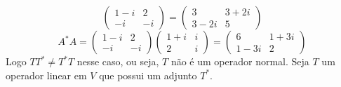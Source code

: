 \documentclass[11pt,a4paper]{article}
\begin{document}
{\[\begin{pmatrix}
1-i & 2\\
-i & -i
\end{pmatrix} = \begin{pmatrix}
3 & 3 +2i\\
3-2i & 5
\end{pmatrix}
\]
\[
A^{*}A = 
\begin{pmatrix}
1-i & 2\\
-i & -i
\end{pmatrix} \begin{pmatrix}
1+i & i \\
2 & i
\end{pmatrix} =
\begin{pmatrix}
6 & 1+3i\\
1-3i & 2
\end{pmatrix}
\]
Logo $TT^{*} \neq T^{*}T$ nesse caso, ou seja, $T$ não é um operador normal.
}
 Seja $T$ um operador linear em $V$ que possui um adjunto $T^{*}.$
\end{document}
